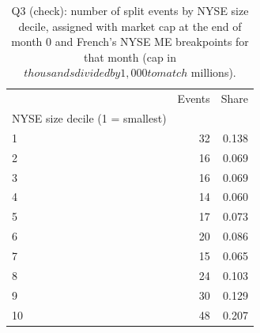 \begin{table}
\caption{Q3 (check): number of split events by NYSE size decile, assigned with market cap at the end of month 0 and French's NYSE ME breakpoints for that month (cap in $ thousands divided by 1,000 to match $ millions).}
\label{tab:decile}
\begin{tabular}{lrr}
\toprule
 & Events & Share \\
NYSE size decile (1 = smallest) &  &  \\
\midrule
1 & 32 & 0.138 \\
2 & 16 & 0.069 \\
3 & 16 & 0.069 \\
4 & 14 & 0.060 \\
5 & 17 & 0.073 \\
6 & 20 & 0.086 \\
7 & 15 & 0.065 \\
8 & 24 & 0.103 \\
9 & 30 & 0.129 \\
10 & 48 & 0.207 \\
\bottomrule
\end{tabular}
\end{table}
